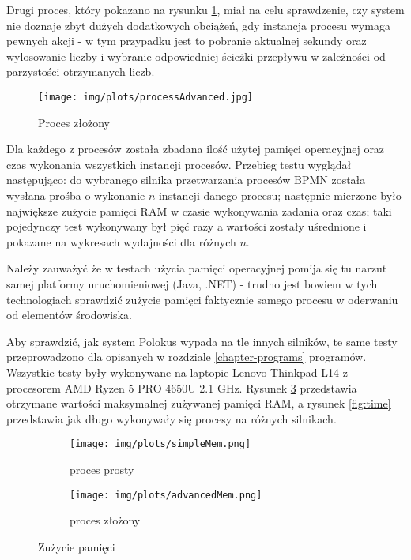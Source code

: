 \documentclass[declaration,shortabstract,mgr]{iithesis}
\newcommand{\bpmn}{BPMN }
\begin{document}
Drugi proces, który pokazano na rysunku \ref{process-advanced}, miał na celu sprawdzenie, czy system nie doznaje zbyt dużych dodatkowych obciążeń, gdy instancja procesu wymaga pewnych akcji - w tym przypadku jest to pobranie aktualnej sekundy oraz wylosowanie liczby i wybranie odpowiedniej ścieżki przepływu w zależności od parzystości otrzymanych liczb.

\begin{figure}[h]
     \centering
     \texttt{[image: img/plots/processAdvanced.jpg]}
     \caption{Proces złożony}
     \label{process-advanced}
\end{figure}

Dla każdego z procesów została zbadana ilość użytej pamięci operacyjnej oraz czas wykonania wszystkich instancji procesów. Przebieg testu wyglądał następująco: do wybranego silnika przetwarzania procesów \bpmn została wysłana prośba o wykonanie $n$ instancji danego procesu; następnie mierzone było największe zużycie pamięci RAM w czasie wykonywania zadania oraz czas; taki pojedynczy test wykonywany był pięć razy a wartości zostały uśrednione i pokazane na wykresach wydajności dla różnych $n$.

Należy zauważyć że w testach użycia pamięci operacyjnej pomija się tu narzut samej platformy uruchomieniowej (Java, .NET) - trudno jest bowiem w tych technologiach sprawdzić zużycie pamięci faktycznie samego procesu w oderwaniu od elementów środowiska. 

Aby sprawdzić, jak system Polokus wypada na tle innych silników, te same testy przeprowadzono dla opisanych w rozdziale \ref{chapter-programs} programów. Wszystkie testy były wykonywane na laptopie Lenovo Thinkpad L14 z procesorem AMD Ryzen 5 PRO 4650U 2.1 GHz. Rysunek \ref{fig:mem} przedstawia otrzymane wartości maksymalnej zużywanej pamięci RAM, a rysunek \ref{fig:time} przedstawia jak długo wykonywały się procesy na różnych silnikach.

\begin{figure}[H]
     \centering
     \begin{subfigure}[b]{0.49\textwidth}
         \centering
         \texttt{[image: img/plots/simpleMem.png]}
         \caption{proces prosty}
     \end{subfigure}
     \hfill
     \begin{subfigure}[b]{0.49\textwidth}
         \centering
         \texttt{[image: img/plots/advancedMem.png]}
         \caption{proces złożony}
         \label{fig:mem-adv}
     \end{subfigure}
        \caption{Zużycie pamięci}
        \label{fig:mem}
\end{figure}
\end{document}
